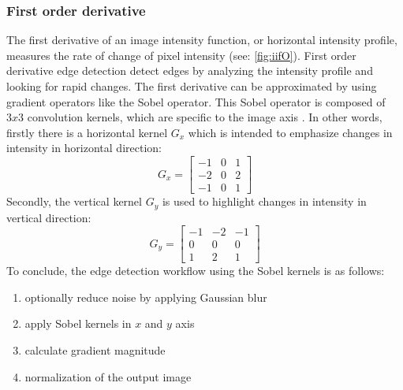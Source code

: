 \subsubsection*{First order derivative}
The first derivative of an image intensity function, or horizontal intensity profile,
measures the rate of change of pixel intensity (see: \cref{fig:iifO}).
First order derivative edge detection detect edges by analyzing the intensity profile and looking for rapid changes.
The first derivative can be approximated by using gradient operators like the Sobel operator.
This Sobel operator is composed of $3x3$ convolution kernels,
which are specific to the image axis \cite{gonzalezDigitalImageProcessing2007}.
In other words,  firstly there is a horizontal kernel $G_{x}$ which is intended to emphasize changes in
intensity in horizontal direction:
\begin{equation}
	G_{x} =
	\begin{bmatrix}
		-1 & 0 & 1 \\
		-2 & 0 & 2 \\
		-1 & 0 & 1
	\end{bmatrix}
\end{equation}
\noindent
Secondly, the vertical kernel $G_{y}$ is used to highlight changes in intensity in vertical direction:
\begin{equation}
	G_{y} =
	\begin{bmatrix}
		-1 & -2 & -1 \\
		0  & 0  & 0  \\
		1  & 2  & 1
	\end{bmatrix}
\end{equation}
To conclude, the edge detection workflow using the Sobel kernels is as follows:
\begin{enumerate}
	\item optionally reduce noise by applying Gaussian blur
	\item apply Sobel kernels in $x$ and $y$ axis
	\item calculate gradient magnitude %
	\item normalization of the output image
\end{enumerate}

